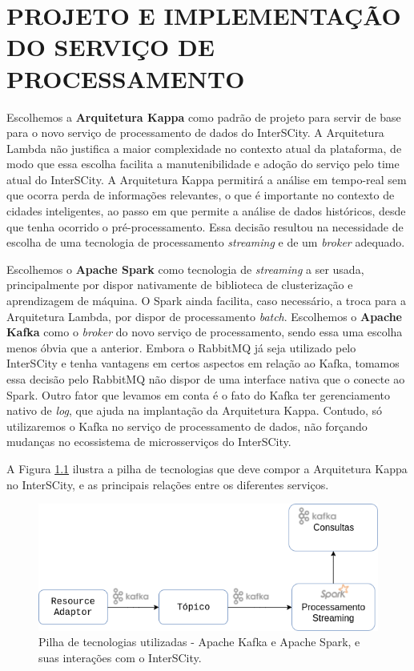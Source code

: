 \chapter[PROJETO E IMPLEMENTAÇÃO DO SERVIÇO DE PROCESSAMENTO]{PROJETO E IMPLEMENTAÇÃO DO SERVIÇO DE PROCESSAMENTO}

\label{chapter:architecture}

Escolhemos a \textbf{Arquitetura Kappa} como padrão de projeto para servir
de base para o novo serviço de processamento de dados do InterSCity.
A Arquitetura Lambda não justifica a maior complexidade no contexto atual da
plataforma, de modo que essa escolha facilita a manutenibilidade e adoção do
serviço pelo time atual do InterSCity. A Arquitetura Kappa permitirá a análise
em tempo-real sem que ocorra perda de informações relevantes, o que é
importante no contexto de cidades inteligentes, ao passo em que permite a
análise de dados históricos, desde que tenha ocorrido o pré-processamento.
Essa decisão resultou na necessidade de escolha de uma tecnologia de
processamento \textit{streaming} e de um \textit{broker} adequado.

Escolhemos o \textbf{Apache Spark} como tecnologia de \textit{streaming}
a ser usada, principalmente por dispor nativamente de biblioteca de clusterização
e aprendizagem de máquina. O Spark ainda facilita, caso necessário, a
troca para a Arquitetura Lambda, por dispor de processamento \textit{batch}.
Escolhemos o \textbf{Apache Kafka} como o \textit{broker} do novo serviço de
processamento, sendo essa uma escolha menos óbvia que a anterior. Embora o
RabbitMQ já seja utilizado pelo InterSCity e tenha vantagens em certos aspectos
em relação ao Kafka, tomamos essa decisão pelo RabbitMQ não dispor de uma
interface nativa que o conecte ao Spark. Outro fator que levamos em conta é o
fato do Kafka ter gerenciamento nativo de \textit{log}, que ajuda na
implantação da Arquitetura Kappa. Contudo, só utilizaremos o Kafka no serviço
de processamento de dados, não forçando mudanças no ecossistema de
microsserviços do InterSCity.

A Figura \ref{fig:stack} ilustra a pilha de tecnologias que deve compor a
Arquitetura Kappa no InterSCity, e as principais relações entre os diferentes
serviços.

\begin{figure}
  \centering
    \includegraphics[scale=0.5]{figuras/kappa_tools2.png}
  \caption{Pilha de tecnologias utilizadas - Apache Kafka e Apache Spark, e suas
    interações com o InterSCity.}
  \label{fig:stack}
\end{figure}

